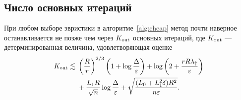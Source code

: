 \subsection{Число основных итераций}\label{app:count-proof}

\begin{lemma}\label{lem:outer-count}
При любом выборе эвристики в алгоритме~\ref{alg:cheap}
метод почти наверное останавливается
не позже чем через $K_{\rm out}$ основных итераций, где
$K_{\rm out}$ --- детерминированная величина, удовлетворяющая оценке
\begin{equation}\label{eq:outer-budget}
 \begin{aligned}
 K_{\rm out}\lesssim{}
 &\left(\frac Rr\right)^{2/3}\left(1+\log\frac\Delta\varepsilon\right)
 +\log\left(2+\frac{rR\lambda_{\uparrow}}\varepsilon\right)\\
 &+\frac{L_1R}{\sqrt n}\log\frac\Delta\varepsilon
 +\sqrt{\frac{(L_0+L_1^2\delta)R^2}{n\varepsilon}}.
 \end{aligned}
\end{equation}
\end{lemma}

